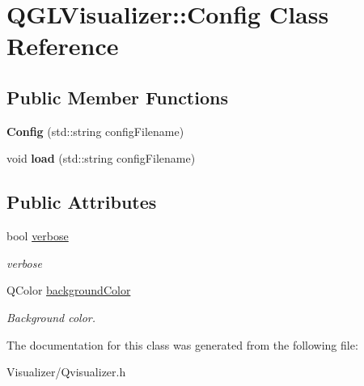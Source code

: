 \hypertarget{classQGLVisualizer_1_1Config}{}\section{Q\+G\+L\+Visualizer\+:\+:Config Class Reference}
\label{classQGLVisualizer_1_1Config}
\subsection*{Public Member Functions}
\begin{DoxyCompactItemize}
\item 
{\bfseries Config} (std\+::string config\+Filename)\hypertarget{classQGLVisualizer_1_1Config_a29d9f987c62e30900b2abb4b7c637011}{}\label{classQGLVisualizer_1_1Config_a29d9f987c62e30900b2abb4b7c637011}

\item 
void {\bfseries load} (std\+::string config\+Filename)\hypertarget{classQGLVisualizer_1_1Config_ad48e81a15ef56cd9fd723ebd982e0451}{}\label{classQGLVisualizer_1_1Config_ad48e81a15ef56cd9fd723ebd982e0451}

\end{DoxyCompactItemize}
\subsection*{Public Attributes}
\begin{DoxyCompactItemize}
\item 
bool \hyperlink{classQGLVisualizer_1_1Config_aae3376a63659789ed8a26b281c2f6f1a}{verbose}\hypertarget{classQGLVisualizer_1_1Config_aae3376a63659789ed8a26b281c2f6f1a}{}\label{classQGLVisualizer_1_1Config_aae3376a63659789ed8a26b281c2f6f1a}

\begin{DoxyCompactList}\small\item\em verbose \end{DoxyCompactList}\item 
Q\+Color \hyperlink{classQGLVisualizer_1_1Config_a6bc848665e8e4c762b295931b07ffd08}{background\+Color}\hypertarget{classQGLVisualizer_1_1Config_a6bc848665e8e4c762b295931b07ffd08}{}\label{classQGLVisualizer_1_1Config_a6bc848665e8e4c762b295931b07ffd08}

\begin{DoxyCompactList}\small\item\em Background color. \end{DoxyCompactList}\end{DoxyCompactItemize}


The documentation for this class was generated from the following file\+:\begin{DoxyCompactItemize}
\item 
Visualizer/Qvisualizer.\+h\end{DoxyCompactItemize}
